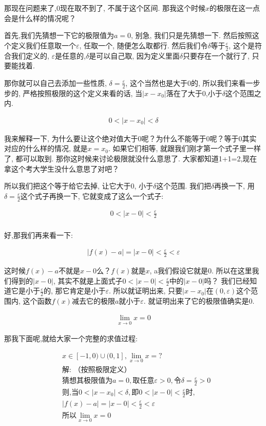 那现在问题来了,0现在取不到了, 不属于这个区间. 那我这个时候$x$的极限在这一点会是什么样的情况呢？

首先,我们先猜想一下它的极限值为$a=0$, 别急, 我们只是先猜想一下. 然后按照这个定义我们任意取一个$\varepsilon$, 任取一个, 随便怎么取都行. 然后我们令$\delta$等于$\frac{\varepsilon}{2}$, 这个是符合我们定义的, $\varepsilon$是任意的,$\delta$是可以自己取, 因为定义里面$\delta$只要存在一个就行了, 只要能找着. 

那你就可以自己去添加一些性质, $\delta = \frac{\varepsilon}{2}$, 这个当然也是大于0的, 所以我们来看一步步的, 严格按照极限的这个定义来看的话, 当$|x-x_0|$落在了大于0,小于$\delta$这个范围之内. 

\begin{align*}
  0 < |x-x_0| < \delta
\end{align*}

我来解释一下, 为什么要让这个绝对值大于0呢？为什么不能等于0呢？等于0其实对应的什么样的情况, 就是$x=x_0$. 如果它们相等, 就跟我们刚才第一个式子里一样了, 都可以取到. 那你这时候来讨论极限就没什么意思了. 大家都知道1+1=2,现在拿这个考大学生没什么意思了对吧？

所以我们把这个等于给它去掉, 让它大于0, 小于$\delta$这个范围. 我们把$\delta$再换一下, 用$\delta = \frac{\varepsilon}{2}$这个式子再换一下, 它就变成了这么一个式子: 

\begin{align*}
  0 < |x - 0| < \frac{\varepsilon}{2} \\
\end{align*}

好,那我们再来看一下: 

\begin{align*}
  |f(x)-a| = |x - 0| < \frac{\varepsilon}{2} < \varepsilon
\end{align*}


这时候$f(x)-a$不就是$x-0$么？$f(x)$就是$x$, a我们假设它就是0. 所以在这里我们得到的$|x-0|$, 其实不就是上面式子$0<|x-0|<\frac{\varepsilon}{2}$中的$|x-0|$吗？ 我们已经知道它是小于$\frac{\varepsilon}{2}$的, 那它肯定是小于$\varepsilon$. 所以就证明出来, 只要$|x-x_0|$在$(0, \varepsilon)$这个范围内, 这个函数$f(x)$减去它的极限$a$就小于$\varepsilon$. 就证明出来了它的极限值确实是0. 

\begin{align*}
  \lim_{x \to 0} x = 0
\end{align*}

那我下面呢,就给大家一个完整的求值过程: 

\begin{align*}
  & x \in [-1,0) \cup (0, 1], \lim_{x \to 0} x = ? \\
  & \mbox{解:  （按照极限定义）}\\
  & \mbox{猜想其极限值为}a = 0, \mbox{取任意}\varepsilon > 0, \mbox{令} \delta = \frac{\varepsilon}{2} > 0 \\
  & \mbox{则,当} 0 < |x-x_0| < \delta, \mbox{即} 0<|x-0| < \frac{\varepsilon}{2} \mbox{时},\\
  & |f(x) - a| = |x - 0| < \frac{\varepsilon}{2} < \varepsilon \\
  & \mbox{所以} \lim_{x \to 0} x = 0
\end{align*}

